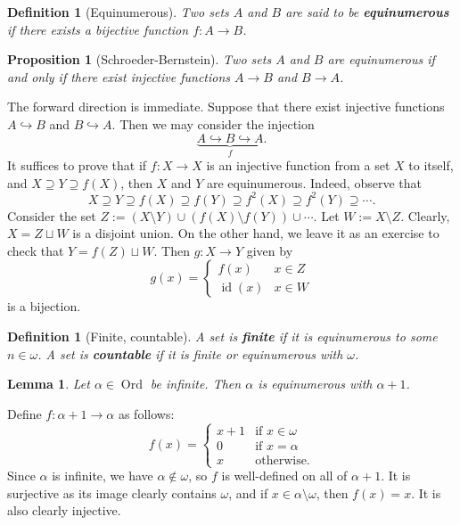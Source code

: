 \documentclass[10pt]{article}
\makeatletter
\DeclareMathOperator{\Ord}{Ord}
\DeclareMathOperator{\id}{id}
\theoremstyle{newstyle}
\newtheorem{lemma}[thm]{Lemma}
\newtheorem{prop}[thm]{Proposition}
\newtheorem{defn}[thm]{Definition}
\newenvironment{pf}[1][\proofname]{\par
  \pushQED{\qed}%
  \normalfont \topsep0\p@\relax
  \trivlist
  \item[\hskip\labelsep\scshape
  #1\@addpunct{.}]\ignorespaces
}{%
  \popQED\endtrivlist\@endpefalse
}
\makeatother
\begin{document}
\begin{defn}[Equinumerous] 
Two sets $A$ and $B$ are said to be {\bf equinumerous} if there exists a bijective function 
$f : A \to B$. 
\end{defn} 

\begin{prop}[Schroeder-Bernstein] 
Two sets $A$ and $B$ are equinumerous if and only if there exist injective functions $A \to B$ 
and $B \to A$. 
\end{prop} 
\begin{pf} 
The forward direction is immediate. Suppose that there exist injective functions $A \hookrightarrow B$ 
and $B \hookrightarrow A$. Then we may consider the injection 
\[ \underbrace{A \hookrightarrow B \hookrightarrow A}_{f}. \] 
It suffices to prove that if $f : X \to X$ is an injective function from a set $X$ to itself, 
and $X \supseteq Y \supseteq f(X)$, then $X$ and $Y$ are equinumerous. Indeed, observe that 
\[ X \supseteq Y \supseteq f(X) \supseteq f(Y) \supseteq f^2(X) \supseteq f^2(Y) \supseteq \cdots. \] 
Consider the set $Z := (X \setminus Y) \cup (f(X) \setminus f(Y)) \cup \cdots$. 
Let $W := X \setminus Z$. Clearly, $X = Z \sqcup W$ is a disjoint union. On the other hand, 
we leave it as an exercise to check that $Y = f(Z) \sqcup W$. Then $g: X \to Y$ given by 
\[ g(x) = \begin{cases} f(x) & x \in Z \\ \id(x) & x \in W \end{cases} \] 
is a bijection. 
\end{pf}

\begin{defn}[Finite, countable] 
A set is {\bf finite} if it is equinumerous to some $n \in \omega$. A set is 
{\bf countable} if it is finite or equinumerous with $\omega$. 
\end{defn} 

\begin{lemma} 
Let $\alpha \in \Ord$ be infinite. Then $\alpha$ is equinumerous with $\alpha + 1$. 
\end{lemma}
\begin{pf}
Define $f : \alpha+1 \to \alpha$ as follows: 
\[ f(x) = \begin{cases} x+1 & \text{if } x \in \omega \\ 0 & \text{if } x = \alpha \\ x & \text{otherwise.} \end{cases} \] 
Since $\alpha$ is infinite, we have $\alpha \notin \omega$, so $f$ is well-defined on all 
of $\alpha+1$. It is surjective as its image clearly contains $\omega$, and if 
$x \in \alpha \setminus \omega$, then $f(x) = x$. It is also clearly injective. 
\end{pf}
\end{document}
